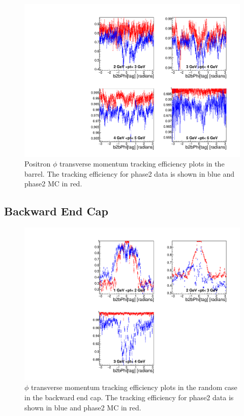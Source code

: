 \documentclass[a4paper,11pt,twosided,final,german,openbib,pdftex,listof=totoc,bibliography=totoc]{scrbook}
\begin{document}
\begin{figure}[!htbp]
	\centering
	\includegraphics[width=\textwidth]{Plots/master/xPtMPhiepBarrel}
	\caption[Transverse Momentum $\phi$ Positron Barrel Efficiency Phase2]{Positron $\phi$ transverse momentum tracking efficiency plots in the barrel. The tracking efficiency for phase2 data is shown in blue and phase2 MC in red.}
\end{figure}




\newpage





\subsection{Backward End Cap}

\begin{figure}[!htbp]
	\centering
	\includegraphics[width=\textwidth]{Plots/master/xPtMPhiRandomEC}
	\caption[Transverse Momentum $\phi$ Random Backward End Cap Efficiency Phase2]{$\phi$ transverse momentum tracking efficiency plots in the random case in the backward end cap. The tracking efficiency for phase2 data is shown in blue and phase2 MC in red.}
\end{figure}
\end{document}
